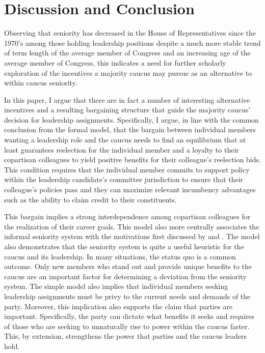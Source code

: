 \documentclass [12pt]{article}
\begin{document}
{{\section*{Discussion and Conclusion}

Observing that seniority has decreased in the House of Representatives since the 1970's among those holding leadership positions despite a much more stable trend of term length of the average member of Congress and an increasing age of the average member of Congress, this indicates a need for further scholarly exploration of the incentives a majority caucus may pursue as an alternative to within caucus seniority. 

In this paper, I argue that there are in fact a number of interesting alternative incentives and a resulting bargaining structure that guide the majority caucus' decision for leadership assignments. Specifically, I argue, in line with the common conclusion from the formal model, that the bargain between individual members wanting a leadership role and the caucus needs to find an equilibrium that at least guarantees reelection for the individual member and a loyalty to their copartisan colleagues to yield positive benefits for their colleague's reelection bids. This condition requires that the individual member commits to support policy within the leadership candidate's committee jurisdiction to ensure that their colleague's policies pass and they can maximize relevant incumbency advantages such as the ability to claim credit to their constituents.

This bargain implies a strong interdependence among copartisan colleagues for the realization of their career goals. This model also more centrally associates the informal seniority system with the motivations first discussed by  and . The model also demonstrates that the seniority system is quite a useful heuristic for the caucus and its leadership. In many situations, the status quo is a common outcome. Only new members who stand out and provide unique benefits to the caucus are an important factor for determining a deviation from the seniority system. The simple model also implies that individual members seeking leadership assignments must be privy to the current needs and demands of the party. Moreover, this implication also supports the claim that parties are important. Specifically, the party can dictate what benefits it seeks and requires of those who are seeking to unnaturally rise to power within the caucus faster. This, by extension, strengthens the power that parties and the caucus leaders hold. 

}}
\end{document}
